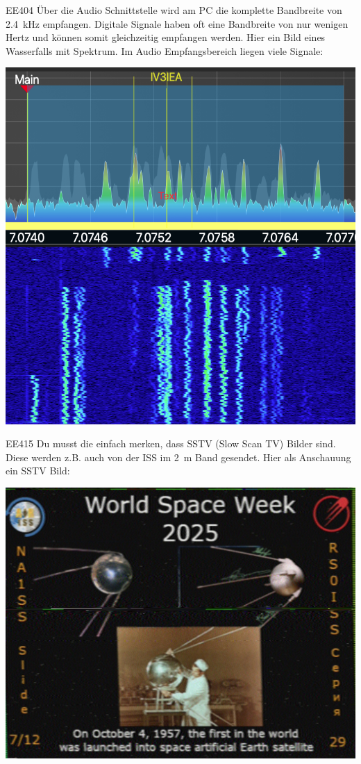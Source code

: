 \documentclass[10pt,a4paper,ngerman]{article}
\theoremstyle{definition}
\theoremstyle{plain}
\theoremstyle{mytheorem}
\theoremstyle{definition}
\begin{document}
\begin{sol}{EE404}
Über die Audio Schnittstelle wird am PC die komplette Bandbreite von \SI{2.4}{\kilo\hertz} empfangen. 
Digitale Signale haben oft eine Bandbreite von nur wenigen Hertz und können somit gleichzeitig empfangen werden.
Hier ein Bild eines Wasserfalls mit Spektrum. Im Audio Empfangsbereich liegen viele Signale:
  \begin{center}
    \includegraphics[scale=.5]{bilder/ft8.png}    
  \end{center}
\end{sol}

\begin{sol}{EE415}
  Du musst die einfach merken, dass SSTV (Slow Scan TV) Bilder sind. Diese werden z.B. auch von der ISS im \SI{2}{\meter}  Band gesendet. Hier als Anschauung ein SSTV Bild:
  \begin{center}
    \includegraphics[scale=.15]{bilder/sstv.jpg}    
  \end{center}
  
\end{sol}
\end{document}
